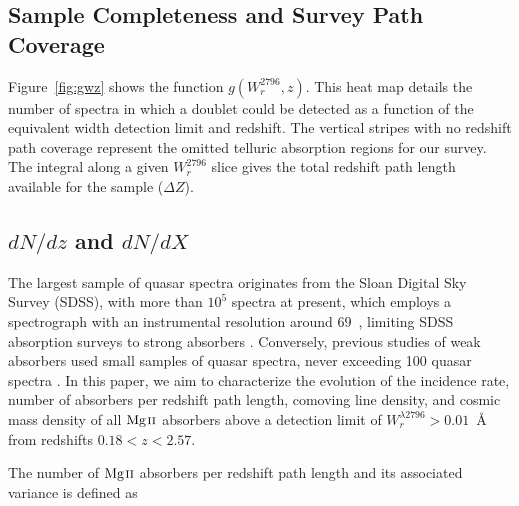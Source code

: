 \documentclass[iop,apj,numberedappendix,appendixfloats,twocolappendix]{emulateapj}
\begin{document}
\subsection{Sample Completeness and Survey Path Coverage}

\begin{figure*}[bth]
\caption{The function $g(W_r^{2796}, z)$ shown as a heat map with the colors representing the value of $g(W_r^{2796}, z)$. This is the number of spectra in which an absorption line of a given equivalent width and a given redshift may be detected according to the detection limit of the spectrum. The vertical black bars representing no redshift path length coverage show the omitted wavelength regions of the survey based upon contaminating telluric absorption features.}
\label{fig:gwz}
\end{figure*}

Figure~\ref{fig:gwz} shows the function $g(W_r^{2796}, z)$. This heat map details the number of spectra in which a {\MgIIdblt} doublet could be detected as a function of the equivalent width detection limit and redshift. The vertical stripes with no redshift path coverage represent the omitted telluric absorption regions for our survey. The integral along a given $W_r^{2796}$ slice gives the total redshift path length available for the sample ($\Delta Z$). 

\subsection{$dN\!/dz$ and $dN\!/dX$}
\label{dndzdndx}

The largest sample of quasar spectra originates from the Sloan Digital Sky Survey (SDSS), with more than $10^5$ spectra at present, which employs a spectrograph with an instrumental resolution around $69$~{\kms}, limiting SDSS absorption surveys to strong absorbers \citep{Nestor2005,Zhu2013}. Conversely, previous studies of weak absorbers used small samples of quasar spectra, never exceeding 100 quasar spectra \citep{Steidel1992,Narayanan2007,Kacprzak2011}. In this paper, we aim to characterize the evolution of the incidence rate, number of absorbers per redshift path length, comoving line density, and cosmic mass density of all ${\hbox{{\rm Mg}\kern 0.1em{\sc ii}}}$ absorbers above a detection limit of $W_r^{\lambda2796} > 0.01$~{\AA} from redshifts $0.18 < z < 2.57$.

The number of ${\hbox{{\rm Mg}\kern 0.1em{\sc ii}}}$ absorbers per redshift path length and its associated variance is defined as
\end{document}
